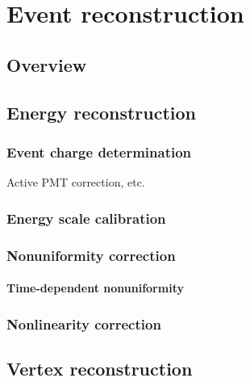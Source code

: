 \documentclass[../thesis.tex]{subfiles}
\begin{document}
\chapter{Event reconstruction}
\label{chap:recon}

\section{Overview}

\section{Energy reconstruction}
\label{sec:reconEnergy}

\subsection{Event charge determination}
\label{sec:reconEnergyChage}

Active PMT correction, etc.

\subsection{Energy scale calibration}
\label{sec:reconEnergyScale}

\subsection{Nonuniformity correction}
\label{sec:reconEnergyNU}

\subsubsection{Time-dependent nonuniformity}
\label{sec:reconEnergyTDNU}

\subsection{Nonlinearity correction}
\label{sec:reconEnergyNL}

\section{Vertex reconstruction}
\label{sec:reconVertex}
\end{document}
